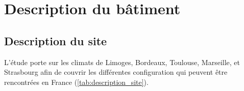 \section{Description du bâtiment} %
\label{sec:description_du_batiment}

\subsection{Description du site} %
\label{sub:description_du_site}
L’étude porte sur les climats de Limoges, Bordeaux, Toulouse, Marseille, et Strasbourg
afin de couvrir les différentes configuration qui peuvent être rencontrées en
France (\ref{tab:description_site}).
\scriptsize
